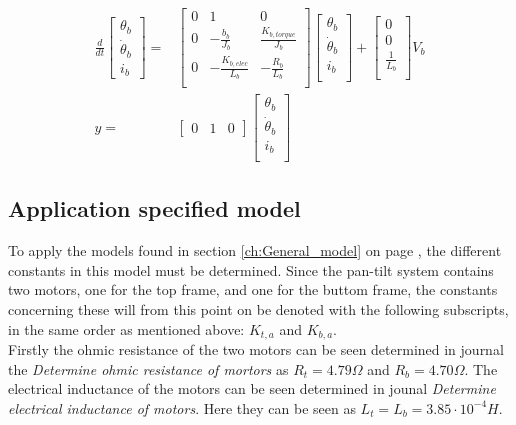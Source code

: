 \documentclass[../../main]{subfiles}
\begin{document}
\begin{equation}
      \label{eq:ss_buttomframe_Genereal_model}
      \begin{split}
      \frac{d}{dt}
    \begin{bmatrix}
        \theta_b \\
        \dot \theta_b \\
        i_b
    \end{bmatrix}
    =&
    \begin{bmatrix}
        0 & 1               & 0             \\
        0 & -\frac{b_b}{J_b}    & \frac{K_{b,torque}}{J_b} \\
        0 & -\frac{K_{b,elec}}{L_b}  & -\frac{R_b}{L_b}  \\
    \end{bmatrix}
    \begin{bmatrix}
        \theta_b \\
        \dot \theta_b \\
        i_b \\
    \end{bmatrix}
    +
    \begin{bmatrix}
        0 \\
        0 \\
        \frac{1}{L_b} \\
    \end{bmatrix}
    V_b
\\
      y =&
    \begin{bmatrix}
        0 & 1 & 0
    \end{bmatrix}
    \begin{bmatrix}
        \theta_b \\
        \dot \theta_b\\
        i_b\\
    \end{bmatrix}
  \end{split}
\end{equation}


\subsection{Application specified model}

To apply the models found in section \ref{ch:General_model} on page \pageref{ch:General_model}, the different constants in this model must be determined. Since the pan-tilt system contains two motors, one for the top frame, and one for the buttom frame, the constants concerning these will from this point on be denoted with the following subscripts, in the same order as mentioned above: $K_{t,a}$ and $K_{b,a}$.\\
Firstly the ohmic resistance of the two motors can be seen determined in journal the \textit{Determine ohmic resistance of mortors} as $R_t = 4.79 \si{\Omega}$ and $R_b = 4.70 \si{\Omega}$. The electrical inductance of the motors can be seen determined in jounal \textit{Determine electrical inductance of motors}. Here they can be seen as $L_t = L_b = 3.85\cdot 10^{-4} \si{H}$.\\
\end{document}
